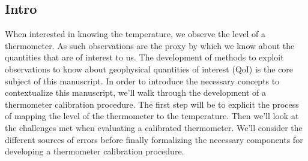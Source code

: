 \begin{bibunit}
%
%
%
%
%
%

  \section{Intro}
When interested in knowing the temperature, we observe the level of a thermometer.
As such observations are the proxy by which we know about the quantities that are of interest to us. 
  The development of methods to exploit observations to know about geophysical quantities of interest (QoI) is the core subject of this manuscript. 
  In order to introduce the necessary concepts to contextualize this manuscript, we'll walk through the development of a thermometer calibration procedure.
  The first step will be to explicit the process of mapping the level of the thermometer to the temperature.
  Then we'll look at the challenges met when evaluating a calibrated thermometer.
  We'll consider the different sources of errors before finally formalizing the necessary components for developing a thermometer calibration procedure.


\end{bibunit}

